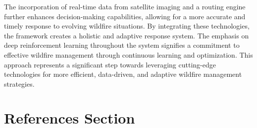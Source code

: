 \documentclass[lettersize,journal]{IEEEtran}
\begin{document}
The incorporation of real-time data from satellite imaging and a routing engine further enhances decision-making capabilities, allowing for a more accurate and timely response to evolving wildfire situations. By integrating these technologies, the framework creates a holistic and adaptive response system. The emphasis on deep reinforcement learning throughout the system signifies a commitment to effective wildfire management through continuous learning and optimization. This approach represents a significant step towards leveraging cutting-edge technologies for more efficient, data-driven, and adaptive wildfire management strategies.


\section{References Section}
 
%
%



% 
% 



% 




\end{document}
